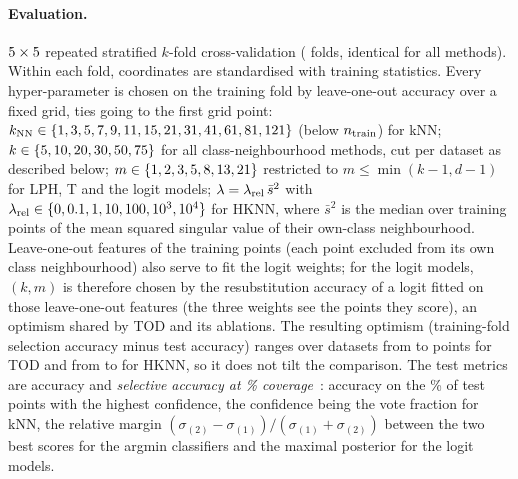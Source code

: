 \documentclass[10pt,a4paper]{article}
\theoremstyle{plain}
\theoremstyle{definition}
\theoremstyle{remark}
\newcommand{\meth}[1]{\textsf{#1}}
\newcommand{\kNN}{k_{\rm NN}}
\begin{document}
\paragraph{Evaluation.} $5\times5$ repeated stratified $k$-fold cross-validation (\MetaFolds{} folds, identical for all methods). Within each fold, coordinates are standardised with training statistics. Every hyper-parameter is chosen on the training fold by leave-one-out accuracy over a fixed grid, ties going to the first grid point: $\kNN\in\{\MetaKnnGrid\}$ (below $n_{\rm train}$) for \meth{kNN}; $k\in\{5, 10, 20, 30, 50, 75\}$ for all class-neighbourhood methods, cut per dataset as described below; $m\in\{1, 2, 3, 5, 8, 13, 21\}$ restricted to $m\le\min(k-1,d-1)$ for \meth{LPH}, \meth{T} and the logit models; $\lambda=\lambda_{\rm rel}\,\bar s^2$ with $\lambda_{\rm rel}\in\{0, 0.1, 1, 10, 100, 10^{3}, 10^{4}\}$ for \meth{HKNN}, where $\bar s^2$ is the median over training points of the mean squared singular value of their own-class neighbourhood. Leave-one-out features of the training points (each point excluded from its own class neighbourhood) also serve to fit the logit weights; for the logit models, $(k,m)$ is therefore chosen by the resubstitution accuracy of a logit fitted on those leave-one-out features (the three weights see the points they score), an optimism shared by \meth{TOD} and its ablations. The resulting optimism (training-fold selection accuracy minus test accuracy) ranges over datasets from \OptimTodMin{} to \OptimTodMax{} points for \meth{TOD} and from \OptimHknnMin{} to \OptimHknnMax{} for \meth{HKNN}, so it does not tilt the comparison. The test metrics are accuracy and \emph{selective accuracy at \MetaCoverage\% coverage}~\citep{chow1970}: accuracy on the \MetaCoverage\% of test points with the highest confidence, the confidence being the vote fraction for \meth{kNN}, the relative margin $(\sigma_{(2)}-\sigma_{(1)})/(\sigma_{(1)}+\sigma_{(2)})$ between the two best scores for the argmin classifiers and the maximal posterior for the logit models.
\end{document}
